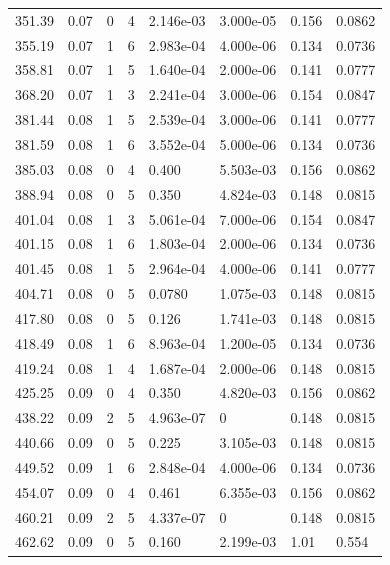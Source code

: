 \documentclass[preview]{standalone}
\begin{document}
{{{\begin{tabular}{L{1.2cm}C{1.2cm} C{0.3cm}C{0.5cm} C{1.4cm}C{1.4cm} C{1.4cm}C{1.4cm}}
  351.39  &  0.07  & 0     &  4 &  2.146e-03  & 3.000e-05  & 0.156 &  0.0862   \\ 
  355.19  &  0.07  & 1     &  6 &  2.983e-04  & 4.000e-06  & 0.134 &  0.0736   \\ 
  358.81  &  0.07  & 1     &  5 &  1.640e-04  & 2.000e-06  & 0.141 &  0.0777   \\ 
  368.20  &  0.07  & 1     &  3 &  2.241e-04  & 3.000e-06  & 0.154 &  0.0847   \\ 
  381.44  &  0.08  & 1     &  5 &  2.539e-04  & 3.000e-06  & 0.141 &  0.0777   \\ 
  381.59  &  0.08  & 1     &  6 &  3.552e-04  & 5.000e-06  & 0.134 &  0.0736   \\ 
  385.03  &  0.08  & 0     &  4 &  0.400  & 5.503e-03  & 0.156 &  0.0862   \\ 
  388.94  &  0.08  & 0     &  5 &  0.350  & 4.824e-03  & 0.148 &  0.0815   \\ 
  401.04  &  0.08  & 1     &  3 &  5.061e-04  & 7.000e-06  & 0.154 &  0.0847   \\ 
  401.15  &  0.08  & 1     &  6 &  1.803e-04  & 2.000e-06  & 0.134 &  0.0736   \\ 
  401.45  &  0.08  & 1     &  5 &  2.964e-04  & 4.000e-06  & 0.141 &  0.0777   \\ 
  404.71  &  0.08  & 0     &  5 &  0.0780  & 1.075e-03  & 0.148 &  0.0815   \\ 
  417.80  &  0.08  & 0     &  5 &  0.126  & 1.741e-03  & 0.148 &  0.0815   \\ 
  418.49  &  0.08  & 1     &  6 &  8.963e-04  & 1.200e-05  & 0.134 &  0.0736   \\ 
  419.24  &  0.08  & 1     &  4 &  1.687e-04  & 2.000e-06  & 0.148 &  0.0815   \\ 
  425.25  &  0.09  & 0     &  4 &  0.350  & 4.820e-03  & 0.156 &  0.0862   \\ 
  438.22  &  0.09  & 2     &  5 &  4.963e-07  & 0  & 0.148 &  0.0815   \\ 
  440.66  &  0.09  & 0     &  5 &  0.225  & 3.105e-03  & 0.148 &  0.0815   \\ 
  449.52  &  0.09  & 1     &  6 &  2.848e-04  & 4.000e-06  & 0.134 &  0.0736   \\ 
  454.07  &  0.09  & 0     &  4 &  0.461  & 6.355e-03  & 0.156 &  0.0862   \\ 
  460.21  &  0.09  & 2     &  5 &  4.337e-07  & 0  & 0.148 &  0.0815   \\ 
  462.62  &  0.09  & 0     &  5 &  0.160  & 2.199e-03  & 1.01 &  0.554   \\ 

\end{tabular}}}}
\end{document}
